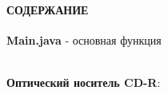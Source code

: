 \documentclass[12pt, a4paper, simple]{eskdtext}
\begin{document}


\thispagestyle{plain}   %
\pagestyle{plain}       %
\hspace{0pt}

\paragraph{СОДЕРЖАНИЕ} \hspace{0pt}

\hspace{0pt}

\textbf{Main.java} - основная функция

\newpage

\begin{center}
    \hspace{0pt} \\
    \textbf{Оптический носитель CD-R}:
\end{center}

\newpage
\end{document}

